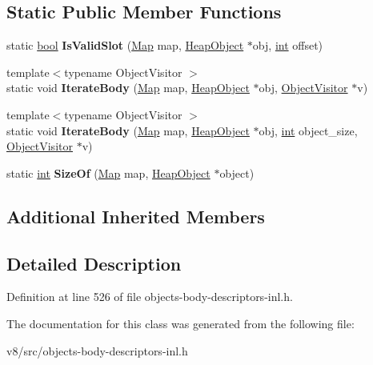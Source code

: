 \subsection*{Static Public Member Functions}
\begin{DoxyCompactItemize}
\item 
\mbox{\label{classv8_1_1internal_1_1Code_1_1BodyDescriptor_a9e6b51e74d3f2449ae59bb35c9561822}} 
static \mbox{\hyperlink{classbool}{bool}} {\bfseries Is\+Valid\+Slot} (\mbox{\hyperlink{classv8_1_1internal_1_1Map}{Map}} map, \mbox{\hyperlink{classv8_1_1internal_1_1HeapObject}{Heap\+Object}} $\ast$obj, \mbox{\hyperlink{classint}{int}} offset)
\item 
\mbox{\label{classv8_1_1internal_1_1Code_1_1BodyDescriptor_ae8e7748f11d3e89707090112eb5fd54c}} 
{\footnotesize template$<$typename Object\+Visitor $>$ }\\static void {\bfseries Iterate\+Body} (\mbox{\hyperlink{classv8_1_1internal_1_1Map}{Map}} map, \mbox{\hyperlink{classv8_1_1internal_1_1HeapObject}{Heap\+Object}} $\ast$obj, \mbox{\hyperlink{classv8_1_1internal_1_1ObjectVisitor}{Object\+Visitor}} $\ast$v)
\item 
\mbox{\label{classv8_1_1internal_1_1Code_1_1BodyDescriptor_a74edba5e21ba9a951e9527481da48c32}} 
{\footnotesize template$<$typename Object\+Visitor $>$ }\\static void {\bfseries Iterate\+Body} (\mbox{\hyperlink{classv8_1_1internal_1_1Map}{Map}} map, \mbox{\hyperlink{classv8_1_1internal_1_1HeapObject}{Heap\+Object}} $\ast$obj, \mbox{\hyperlink{classint}{int}} object\+\_\+size, \mbox{\hyperlink{classv8_1_1internal_1_1ObjectVisitor}{Object\+Visitor}} $\ast$v)
\item 
\mbox{\label{classv8_1_1internal_1_1Code_1_1BodyDescriptor_abc1bb0cbe8af40dd37fcf83fbeded881}} 
static \mbox{\hyperlink{classint}{int}} {\bfseries Size\+Of} (\mbox{\hyperlink{classv8_1_1internal_1_1Map}{Map}} map, \mbox{\hyperlink{classv8_1_1internal_1_1HeapObject}{Heap\+Object}} $\ast$object)
\end{DoxyCompactItemize}
\subsection*{Additional Inherited Members}


\subsection{Detailed Description}


Definition at line 526 of file objects-\/body-\/descriptors-\/inl.\+h.



The documentation for this class was generated from the following file\+:\begin{DoxyCompactItemize}
\item 
v8/src/objects-\/body-\/descriptors-\/inl.\+h\end{DoxyCompactItemize}
